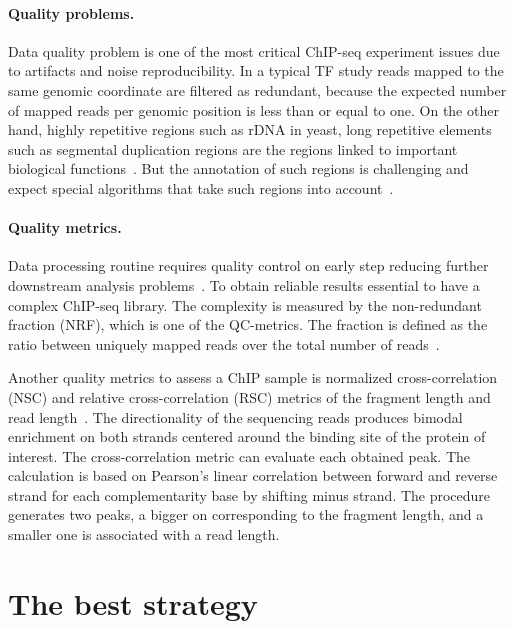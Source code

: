 \paragraph{Quality problems.}
Data quality problem is one of the most critical ChIP-seq experiment issues due to artifacts and noise reproducibility.
In a typical TF study reads mapped to the same genomic coordinate are filtered as redundant, because the expected number of mapped reads per genomic position is less than or equal to one. 
On the other hand, highly repetitive regions such as rDNA in yeast, long repetitive elements such as segmental duplication regions are the regions linked to important biological functions~\cite{nakato2017recent}. But the annotation of such regions is challenging and expect special algorithms that take such regions into account~\cite{chung2011discovering}.

\paragraph{Quality metrics.}
Data processing routine requires quality control on early step reducing further downstream analysis problems~\cite{ewels2016multiqc}.
To obtain reliable results essential to have a complex ChIP-seq library.
The complexity is measured by the non-redundant fraction (NRF), which is one of the QC-metrics.
The fraction is defined as the ratio between uniquely mapped reads over the total number of reads~\cite{landt2012chip}.

Another quality metrics to assess a ChIP sample is normalized cross-correlation (NSC) and relative cross-correlation (RSC) metrics of the fragment length and read length~\cite{landt2012chip, marinov2014large}. 
The directionality of the sequencing reads produces bimodal enrichment on both strands centered around the binding site of the protein of interest. 
The cross-correlation metric can evaluate each obtained peak. 
The calculation is based on Pearson's linear correlation between forward and reverse strand for each complementarity base by shifting minus strand. 
The procedure generates two peaks, a bigger on corresponding to the fragment length, and a smaller one is associated with a read length. 



\section{The best strategy}
\label{strategy}

